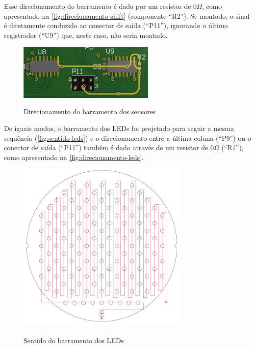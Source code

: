 Esse direcionamento do barramento é dado por um resistor de $0\Omega$, como apresentado na \autoref{fig:direcionamento-shift} (componente ``R2''). Se montado, o sinal é diretamente conduzido ao conector de saída (``P11''), ignorando o último registrador (``U9'') que, neste caso, não seria montado.

\begin{figure}[H]
    \centering
    \caption{Direcionamento do barramento dos sensores}
    \includegraphics[width=0.6\textwidth]{./dados/figuras/res-dir-shift}
    \label{fig:direcionamento-shift}
\end{figure}

De iguais modos, o barramento dos LEDs foi projetado para seguir a mesma sequência (\autoref{fig:sentido-leds}) e o direcionamento entre a última coluna (``P9'') ou o conector de saída (``P11'') também é dado através de um resistor de $0\Omega$ (``R1''), como apresentado na \autoref{fig:direcionamento-leds}.

\begin{figure}[H]
    \centering
    \caption{Sentido do barramento dos LEDs}
    \includegraphics[width=0.75\textwidth]{./dados/figuras/sentido-leds}
    \label{fig:sentido-leds}
\end{figure}

